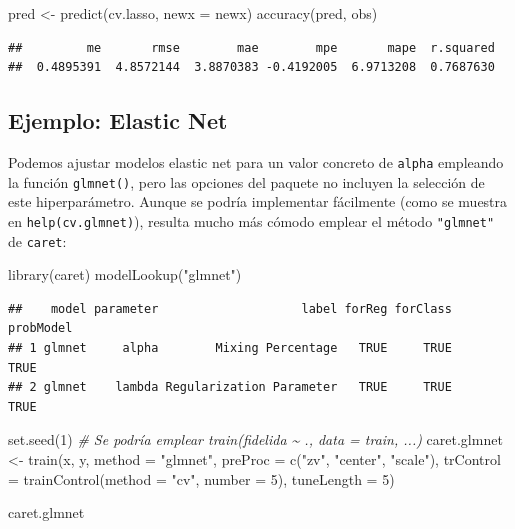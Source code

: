 \documentclass[
]{book}
\newenvironment{Shaded}{\begin{snugshade}}{\end{snugshade}}
\newcommand{\AttributeTok}[1]{\textcolor[rgb]{0.77,0.63,0.00}{#1}}
\newcommand{\CommentTok}[1]{\textcolor[rgb]{0.56,0.35,0.01}{\textit{#1}}}
\newcommand{\DecValTok}[1]{\textcolor[rgb]{0.00,0.00,0.81}{#1}}
\newcommand{\FunctionTok}[1]{\textcolor[rgb]{0.00,0.00,0.00}{#1}}
\newcommand{\NormalTok}[1]{#1}
\newcommand{\OtherTok}[1]{\textcolor[rgb]{0.56,0.35,0.01}{#1}}
\newcommand{\StringTok}[1]{\textcolor[rgb]{0.31,0.60,0.02}{#1}}
\theoremstyle{break}
\theoremstyle{definition}
\theoremstyle{definition}
\theoremstyle{definition}
\theoremstyle{definition}
\theoremstyle{remark}
\begin{document}
\begin{Shaded}
\begin{Highlighting}[]
\NormalTok{pred }\OtherTok{\textless{}{-}} \FunctionTok{predict}\NormalTok{(cv.lasso, }\AttributeTok{newx =}\NormalTok{ newx)}
\FunctionTok{accuracy}\NormalTok{(pred, obs)}
\end{Highlighting}
\end{Shaded}

\begin{verbatim}
##         me       rmse        mae        mpe       mape  r.squared 
##  0.4895391  4.8572144  3.8870383 -0.4192005  6.9713208  0.7687630
\end{verbatim}

\hypertarget{ejemplo-elastic-net}{%
\subsection{Ejemplo: Elastic Net}\label{ejemplo-elastic-net}}

Podemos ajustar modelos elastic net para un valor concreto de \texttt{alpha} empleando la función \texttt{glmnet()}, pero las opciones del paquete no incluyen la selección de este hiperparámetro.
Aunque se podría implementar fácilmente (como se muestra en \texttt{help(cv.glmnet)}), resulta mucho más cómodo emplear el método \texttt{"glmnet"} de \texttt{caret}:

\begin{Shaded}
\begin{Highlighting}[]
\FunctionTok{library}\NormalTok{(caret)}
\FunctionTok{modelLookup}\NormalTok{(}\StringTok{"glmnet"}\NormalTok{) }
\end{Highlighting}
\end{Shaded}

\begin{verbatim}
##    model parameter                    label forReg forClass probModel
## 1 glmnet     alpha        Mixing Percentage   TRUE     TRUE      TRUE
## 2 glmnet    lambda Regularization Parameter   TRUE     TRUE      TRUE
\end{verbatim}

\begin{Shaded}
\begin{Highlighting}[]
\FunctionTok{set.seed}\NormalTok{(}\DecValTok{1}\NormalTok{)}
\CommentTok{\# Se podría emplear train(fidelida \textasciitilde{} ., data = train, ...)}
\NormalTok{caret.glmnet }\OtherTok{\textless{}{-}} \FunctionTok{train}\NormalTok{(x, y, }\AttributeTok{method =} \StringTok{"glmnet"}\NormalTok{,}
    \AttributeTok{preProc =} \FunctionTok{c}\NormalTok{(}\StringTok{"zv"}\NormalTok{, }\StringTok{"center"}\NormalTok{, }\StringTok{"scale"}\NormalTok{),}
    \AttributeTok{trControl =} \FunctionTok{trainControl}\NormalTok{(}\AttributeTok{method =} \StringTok{"cv"}\NormalTok{, }\AttributeTok{number =} \DecValTok{5}\NormalTok{),}
    \AttributeTok{tuneLength =} \DecValTok{5}\NormalTok{)}


\NormalTok{caret.glmnet}
\end{Highlighting}
\end{Shaded}
\end{document}
